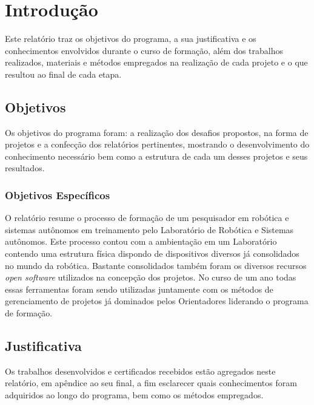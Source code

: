 \chapter{Introdução}
\label{chap:intro}

Este relatório traz os objetivos do programa, a sua justificativa e os conhecimentos envolvidos durante o curso de formação, além dos trabalhos realizados, materiais e métodos empregados na realização de cada projeto e o que resultou ao final de cada etapa.

\section{Objetivos}
\label{sec:obj}

Os objetivos do programa foram: a realização dos desafios propostos, na forma de projetos e a confecção dos relatórios pertinentes, mostrando o desenvolvimento do conhecimento necessário bem como a estrutura de cada um desses projetos e seus resultados.

\subsection{Objetivos Específicos}
\label{ssec:objesp}

O relatório resume o processo de formação de um pesquisador em robótica e sistemas autônomos em treinamento pelo Laboratório de Robótica e Sistemas autônomos. Este processo contou com a ambientação em um Laboratório contendo uma estrutura física dispondo de dispositivos diversos já consolidados no mundo da robótica. Bastante consolidados também foram os diversos recursos \textit{open software} utilizados na concepção dos projetos. No curso de um ano todas essas ferramentas foram sendo utilizadas juntamente com os métodos de gerenciamento de projetos já dominados pelos Orientadores liderando o programa de formação.

\section{Justificativa}
\label{sec:justi}

Os trabalhos desenvolvidos e certificados recebidos estão agregados neste relatório, em apêndice ao seu final, a fim esclarecer quais conhecimentos foram adquiridos ao longo do programa, bem como os métodos empregados.



